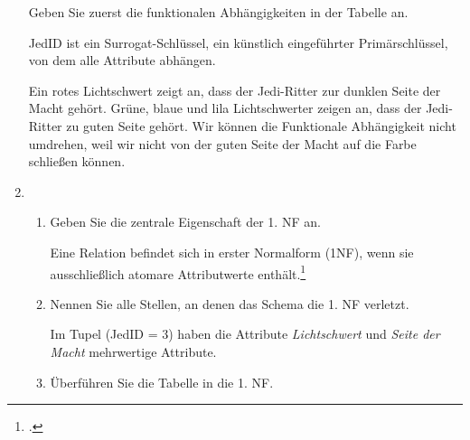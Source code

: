 \documentclass{bschlangaul-aufgabe}
\begin{document}
\begin{enumerate}
Geben Sie zuerst die funktionalen Abhängigkeiten in der Tabelle an.

\begin{bAntwort}

JedID ist ein Surrogat-Schlüssel, \dh ein künstlich eingeführter
Primärschlüssel, von dem alle Attribute abhängen.

Ein rotes Lichtschwert zeigt an, dass der Jedi-Ritter zur dunklen Seite
der Macht gehört. Grüne, blaue und lila Lichtschwerter zeigen an, dass
der Jedi-Ritter zu guten Seite gehört. Wir können die Funktionale
Abhängigkeit nicht umdrehen, weil wir nicht von der guten Seite der
Macht auf die Farbe schließen können.
\end{bAntwort}


\item \strut

\begin{enumerate}


\item Geben Sie die zentrale Eigenschaft der 1. NF an.

\begin{bAntwort}
Eine Relation befindet sich in erster Normalform (1NF), wenn sie
ausschließlich atomare Attributwerte enthält.\footcite[Seite 448]{schneider}
\end{bAntwort}


\item Nennen Sie alle Stellen, an denen das Schema die 1. NF verletzt.

\begin{bAntwort}
Im Tupel (JedID = 3) haben die Attribute \emph{Lichtschwert} und
\emph{Seite der Macht} mehrwertige Attribute.
\end{bAntwort}


\item Überführen Sie die Tabelle in die 1. NF.


\end{enumerate}
\end{enumerate}
\end{document}
